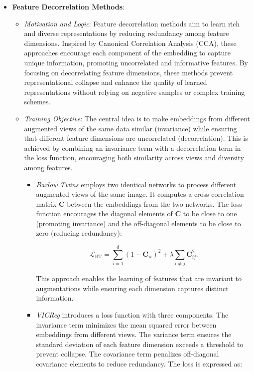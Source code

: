 \begin{itemize}
    \item \textbf{Feature Decorrelation Methods}:
    \begin{itemize}
        \item \emph{Motivation and Logic}: Feature decorrelation methods aim to learn rich and diverse representations by reducing redundancy among feature dimensions. Inspired by Canonical Correlation Analysis (CCA), these approaches encourage each component of the embedding to capture unique information, promoting uncorrelated and informative features. By focusing on decorrelating feature dimensions, these methods prevent representational collapse and enhance the quality of learned representations without relying on negative samples or complex training schemes.
        
        \item \emph{Training Objective}: The central idea is to make embeddings from different augmented views of the same data similar (invariance) while ensuring that different feature dimensions are uncorrelated (decorrelation). This is achieved by combining an invariance term with a decorrelation term in the loss function, encouraging both similarity across views and diversity among features.
        
        \begin{itemize}
            \item \emph{Barlow Twins} \citep{zbontar2021barlow} employs two identical networks to process different augmented views of the same image. It computes a cross-correlation matrix \( \mathbf{C} \) between the embeddings from the two networks. The loss function encourages the diagonal elements of \( \mathbf{C} \) to be close to one (promoting invariance) and the off-diagonal elements to be close to zero (reducing redundancy):
        
            \[
            \mathcal{L}_{\text{BT}} = \sum_{i=1}^d (1 - \mathbf{C}_{ii})^2 + \lambda \sum_{i \neq j} \mathbf{C}_{ij}^2.
            \]
        
            This approach enables the learning of features that are invariant to augmentations while ensuring each dimension captures distinct information.
        
            \item \emph{VICReg} \citep{bardes2021vicreg} introduces a loss function with three components. The invariance term minimizes the mean squared error between embeddings from different views. The variance term ensures the standard deviation of each feature dimension exceeds a threshold to prevent collapse. The covariance term penalizes off-diagonal covariance elements to reduce redundancy. The loss is expressed as:
        

\end{itemize}
\end{itemize}
\end{itemize}
